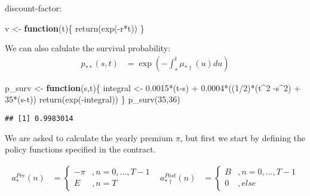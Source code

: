\documentclass[
]{article}
\newenvironment{Shaded}{\begin{snugshade}}{\end{snugshade}}
\newcommand{\ControlFlowTok}[1]{\textcolor[rgb]{0.13,0.29,0.53}{\textbf{#1}}}
\newcommand{\DecValTok}[1]{\textcolor[rgb]{0.00,0.00,0.81}{#1}}
\newcommand{\FloatTok}[1]{\textcolor[rgb]{0.00,0.00,0.81}{#1}}
\newcommand{\FunctionTok}[1]{\textcolor[rgb]{0.00,0.00,0.00}{#1}}
\newcommand{\NormalTok}[1]{#1}
\newcommand{\OtherTok}[1]{\textcolor[rgb]{0.56,0.35,0.01}{#1}}
\newcommand{\SpecialCharTok}[1]{\textcolor[rgb]{0.00,0.00,0.00}{#1}}
\begin{document}
discount-factor:

\begin{Shaded}
\begin{Highlighting}[]
\NormalTok{v }\OtherTok{\textless{}{-}} \ControlFlowTok{function}\NormalTok{(t)\{}
  \FunctionTok{return}\NormalTok{(}\FunctionTok{exp}\NormalTok{(}\SpecialCharTok{{-}}\NormalTok{r}\SpecialCharTok{*}\NormalTok{t))}
\NormalTok{\}}
\end{Highlighting}
\end{Shaded}

We can also calulate the survival probability: \[\begin{aligned}
p_{**}(s,t) &= \exp\left(-\int_{s}^{t}\mu_{*\dagger}(u)du\right)
\end{aligned}\]

\begin{Shaded}
\begin{Highlighting}[]
\NormalTok{p\_surv }\OtherTok{\textless{}{-}} \ControlFlowTok{function}\NormalTok{(s,t)\{}
\NormalTok{  integral }\OtherTok{\textless{}{-}} \FloatTok{0.0015}\SpecialCharTok{*}\NormalTok{(t}\SpecialCharTok{{-}}\NormalTok{s) }\SpecialCharTok{+} \FloatTok{0.0004}\SpecialCharTok{*}\NormalTok{((}\DecValTok{1}\SpecialCharTok{/}\DecValTok{2}\NormalTok{)}\SpecialCharTok{*}\NormalTok{(t}\SpecialCharTok{\^{}}\DecValTok{2} \SpecialCharTok{{-}}\NormalTok{s}\SpecialCharTok{\^{}}\DecValTok{2}\NormalTok{) }\SpecialCharTok{+} \DecValTok{35}\SpecialCharTok{*}\NormalTok{(s}\SpecialCharTok{{-}}\NormalTok{t))}
  \FunctionTok{return}\NormalTok{(}\FunctionTok{exp}\NormalTok{(}\SpecialCharTok{{-}}\NormalTok{integral))}
\NormalTok{\}}
\FunctionTok{p\_surv}\NormalTok{(}\DecValTok{35}\NormalTok{,}\DecValTok{36}\NormalTok{)}
\end{Highlighting}
\end{Shaded}

\begin{verbatim}
## [1] 0.9983014
\end{verbatim}

We are asked to calculate the yearly premium \(\pi\), but first we start
by defining the policy functions specified in the contract.

\[\begin{aligned}
a_{*}^{Pre}(n) &= \begin{cases}
-\pi &, n = 0, \dots, T-1 \\ 
E&, n=T
\end{cases}
\;\;\;
a_{*\dagger}^{Post}(n) &= \begin{cases}
B &, n = 0, \dots, T-1 \\ 
0&, else
\end{cases}
\end{aligned}\]
\end{document}
